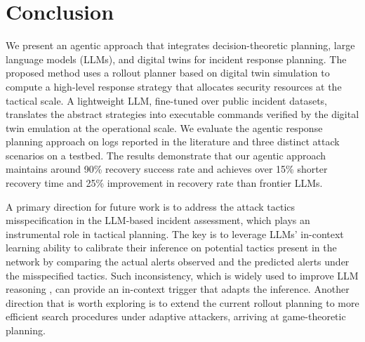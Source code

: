 \documentclass[runningheads,10pt]{llncs}
\begin{document}
\section{Conclusion}
We present an agentic approach that integrates decision-theoretic planning, large language models (LLMs), and digital twins for incident response planning. The proposed method uses a rollout planner based on digital twin simulation to compute a high-level response strategy that allocates security resources at the tactical scale. A lightweight LLM, fine-tuned over public incident datasets, translates the abstract strategies into executable commands verified by the digital twin emulation at the operational scale. We evaluate the agentic response planning approach on logs reported in the literature and three distinct attack scenarios on a testbed. The results demonstrate that our agentic approach maintains around 90\% recovery success rate and achieves over 15\% shorter recovery time and 25\% improvement in recovery rate than frontier LLMs.

A primary direction for future work is to address the attack tactics misspecification in the LLM-based incident assessment, which plays an instrumental role in tactical planning. The key is to leverage LLMs' in-context learning ability to calibrate their inference on potential tactics present in the network by comparing the actual alerts observed and the predicted alerts under the misspecified tactics. Such inconsistency, which is widely used to improve LLM reasoning \cite{wang2023selfconsistency}, can provide an in-context trigger that adapts the inference. Another direction that is worth exploring is to extend the current rollout planning to more efficient search procedures under adaptive attackers, arriving at game-theoretic planning. 



\appendix
\end{document}
